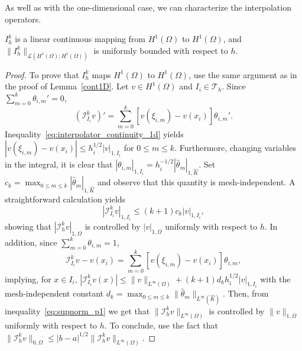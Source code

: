As well as with the one-dimensional case, we can characterize the interpolation operators.
\begin{lemma}
    $I_h^k$ is a linear continuous mapping from $H^1(\Omega)$ to $H^1(\Omega)$, and $\|I_h^k\|_{\mathcal{L}(H^1(\Omega);H^1(\Omega))}$ is uniformly bounded with respect to $h$.
\begin{proof}
    To prove that $I_h^k$ maps $H^1(\Omega)$ to $H^1(\Omega)$, use the same argument as in the proof of Lemma~\ref{cont1D}.
    Let $v \in H^1(\Omega)$ and $I_i \in \mathcal{T}_h$. Since $\sum_{m=0}^k \theta_{i,m}' = 0$,
    \begin{equation*}
(\mathcal{I}_{I_i}^k v)' = \sum_{m=0}^k [v(\xi_{i,m}) - v(x_i)] \theta_{i,m}'.
\end{equation*}
    Inequality~\ref{eq:interpolator_continuity_1d} yields $|v(\xi_{i,m}) - v(x_i)| \le h_i^{1/2} |v|_{1,I_i}$ for $0 \le m \le k$. Furthermore, changing variables in the integral, it is clear that $|\theta_{i,m}|_{1,I_i} = h_i^{-1/2} |\hat{\theta}_m|_{1,\hat{K}}$. Set $c_k = \max_{0 \le m \le k} |\hat{\theta}_m|_{1,\hat{K}}$ and observe that this quantity is mesh-independent. A straightforward calculation yields
    \begin{equation*}
|\mathcal{I}_{I_i}^k v|_{1,I_i} \le (k+1) c_k |v|_{1,I_i},
\end{equation*}
    showing that $|\mathcal{I}_h^k v|_{1,\Omega}$ is controlled by $|v|_{1,\Omega}$ uniformly with respect to $h$. In addition, since $\sum_{m=0}^k \theta_{i,m} = 1$,
    \begin{equation*}
\mathcal{I}_{I_i}^k v - v(x_i) = \sum_{m=0}^k [v(\xi_{i,m}) - v(x_i)] \theta_{i,m},
\end{equation*}
    implying, for $x \in I_i$, $|\mathcal{I}_{I_i}^k v(x)| \le \|v\|_{L^\infty(\Omega)} + (k+1) d_k h_i^{1/2} |v|_{1,I_i}$ with the mesh-independent constant $d_k = \max_{0 \le m \le k} \|\hat{\theta}_m\|_{L^\infty(\hat{K})}$. Then, from inequality~\ref{eq:supnorm_p1} we get that $\|\mathcal{I}_h^k v\|_{L^\infty(\Omega)}$ is controlled by $\|v\|_{1,\Omega}$ uniformly with respect to $h$. To conclude, use the fact that $\|\mathcal{I}_h^k v\|_{0,\Omega} \le |b-a|^{1/2} \|\mathcal{I}_h^k v\|_{L^\infty(\Omega)}$.
\end{proof}
\end{lemma}
